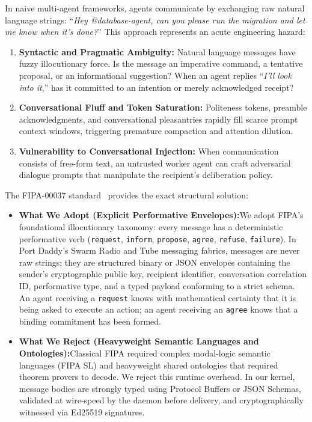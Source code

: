 \documentclass[11pt,a4paper]{article}
\begin{document}
In naive multi-agent frameworks, agents communicate by exchanging raw natural language strings: ``\emph{Hey @database-agent, can you please run the migration and let me know when it's done?}'' This approach represents an acute engineering hazard:
\begin{enumerate}[leftmargin=1.8em,itemsep=2pt]
  \item \textbf{Syntactic and Pragmatic Ambiguity:} Natural language messages have fuzzy illocutionary force. Is the message an imperative command, a tentative proposal, or an informational suggestion? When an agent replies ``\emph{I'll look into it},'' has it committed to an intention or merely acknowledged receipt?
  \item \textbf{Conversational Fluff and Token Saturation:} Politeness tokens, preamble acknowledgments, and conversational pleasantries rapidly fill scarce prompt context windows, triggering premature compaction and attention dilution.
  \item \textbf{Vulnerability to Conversational Injection:} When communication consists of free-form text, an untrusted worker agent can craft adversarial dialogue prompts that manipulate the recipient's deliberation policy.
\end{enumerate}

The FIPA-00037 standard~ provides the exact structural solution:
\begin{itemize}[leftmargin=1.8em,itemsep=2pt]
  \item \textbf{What We Adopt (Explicit Performative Envelopes):}\enspace We adopt FIPA's foundational illocutionary taxonomy: every message has a deterministic performative verb (\texttt{request}, \texttt{inform}, \texttt{propose}, \texttt{agree}, \texttt{refuse}, \texttt{failure}). In Port Daddy's Swarm Radio and Tube messaging fabrics, messages are never raw strings; they are structured binary or JSON envelopes containing the sender's cryptographic public key, recipient identifier, conversation correlation ID, performative type, and a typed payload conforming to a strict schema. An agent receiving a \texttt{request} knows with mathematical certainty that it is being asked to execute an action; an agent receiving an \texttt{agree} knows that a binding commitment has been formed.
  \item \textbf{What We Reject (Heavyweight Semantic Languages and Ontologies):}\enspace Classical FIPA required complex modal-logic semantic languages (FIPA SL) and heavyweight shared ontologies that required theorem provers to decode. We reject this runtime overhead. In our kernel, message bodies are strongly typed using Protocol Buffers or JSON Schemas, validated at wire-speed by the daemon before delivery, and cryptographically witnessed via Ed25519 signatures.
\end{itemize}
\end{document}
